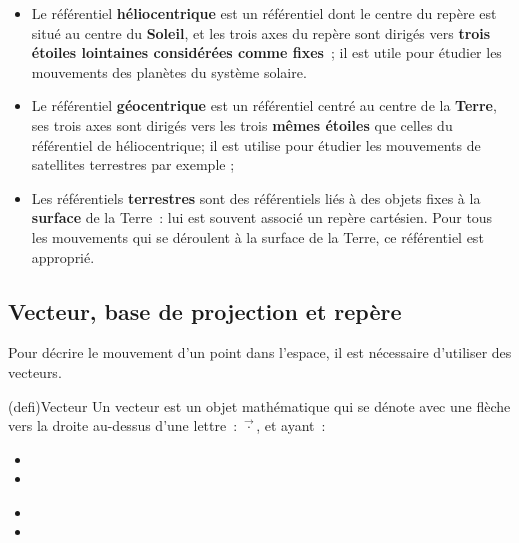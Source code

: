 \documentclass[../../main/main.tex]{subfiles}
\begin{document}
\begin{itemize}

	\item Le référentiel \textbf{héliocentrique} est un référentiel dont le
	      centre du repère est situé au centre du \textbf{Soleil}, et les trois
	      axes du repère sont dirigés vers \textbf{trois étoiles lointaines
		      considérées comme fixes}~; il est utile pour étudier les mouvements des
	      planètes du système solaire.

	\item Le référentiel \textbf{géocentrique} est un référentiel centré au
	      centre de la \textbf{Terre}, ses trois axes sont dirigés vers les trois
	      \textbf{mêmes étoiles} que celles du référentiel de héliocentrique; il
	      est utilise pour étudier les mouvements de satellites terrestres par
	      exemple ;

	\item Les référentiels \textbf{terrestres} sont des référentiels liés à des
	      objets fixes à la \textbf{surface} de la Terre~: lui est souvent associé
	      un repère cartésien. Pour tous les mouvements qui se déroulent à la
	      surface de la Terre, ce référentiel est approprié.
\end{itemize}

\subsection{Vecteur, base de projection et repère}
Pour décrire le mouvement d'un point dans l'espace, il est nécessaire d'utiliser
des vecteurs.
\begin{tcb*}(defi){Vecteur}
	Un vecteur est un objet mathématique qui se dénote avec une flèche vers la
	droite au-dessus d'une lettre~: $\vec{\cdot}$, et ayant~:\smallbreak
	\begin{minipage}{0.40\linewidth}
		\begin{itemize}
			\item
			\item
		\end{itemize}
	\end{minipage}
	\begin{minipage}{0.50\linewidth}
		\begin{itemize}
			\item
			\item
		\end{itemize}
	\end{minipage}
	\begin{framed}
		\centering
	\end{framed}
\end{tcb*}
\end{document}
